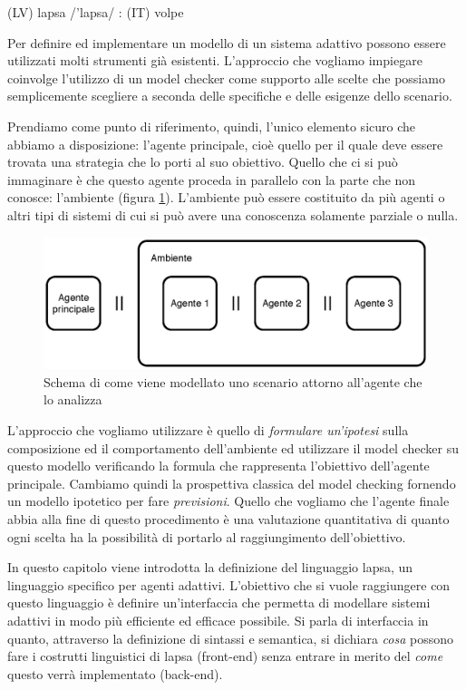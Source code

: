 
\begin{flushright}
	{(\textsc{LV}) lapsa /'lapsa/ : (\textsc{IT}) volpe}
\end{flushright}
Per definire ed implementare un modello di un sistema adattivo possono essere utilizzati molti strumenti già esistenti. L'approccio che vogliamo impiegare coinvolge l'utilizzo di un model checker come supporto alle scelte che possiamo semplicemente scegliere a seconda delle specifiche e delle esigenze dello scenario.

Prendiamo come punto di riferimento, quindi, l'unico elemento sicuro che abbiamo a disposizione: l'agente principale, cioè quello per il quale deve essere trovata una strategia che lo porti al suo obiettivo. Quello che ci si può immaginare è che questo agente proceda in parallelo con la parte che non conosce: l'ambiente (figura \ref{fig:lapsa:schemaidea}). L'ambiente può essere costituito da più agenti o altri tipi di sistemi di cui si può avere una conoscenza solamente parziale o nulla.
\begin{figure}[htbp!]
	\begin{center}
		\includegraphics[width=.8\textwidth]{Images/schemaidea}
	\end{center}
	\caption{Schema di come viene modellato uno scenario attorno all'agente che lo analizza}
	\label{fig:lapsa:schemaidea}
\end{figure}

L'approccio che vogliamo utilizzare è quello di \emph{formulare un'ipotesi} sulla composizione ed il comportamento dell'ambiente ed utilizzare il model checker su questo modello verificando la formula che rappresenta l'obiettivo dell'agente principale. Cambiamo quindi la prospettiva classica del model checking fornendo un modello ipotetico per fare \emph{previsioni}. Quello che vogliamo che l'agente finale abbia alla fine di questo procedimento è una valutazione quantitativa di quanto ogni scelta ha la possibilità di portarlo al raggiungimento dell'obiettivo.

In questo capitolo viene introdotta la definizione del linguaggio \ac{lapsa}, un linguaggio specifico per agenti adattivi. L'obiettivo che si vuole raggiungere con questo linguaggio è definire un'interfaccia che permetta di modellare sistemi adattivi in modo più efficiente ed efficace possibile. Si parla di interfaccia in quanto, attraverso la definizione di sintassi e semantica, si dichiara \emph{cosa} possono fare i costrutti linguistici di \ac{lapsa} (front-end) senza entrare in merito del \emph{come} questo verrà implementato (back-end).


